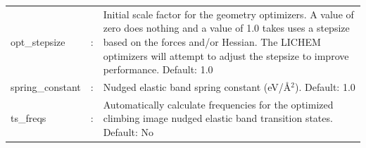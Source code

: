 \documentclass[12pt]{report}
\begin{document}
\begin{center}
\begin{longtable}{ p{4cm} c p{12.5cm}}
\\


opt\_stepsize & : & Initial scale factor for the geometry optimizers.
A value of zero does nothing and a value of 1.0 takes uses a stepsize based
on the forces and/or Hessian. The LICHEM optimizers will attempt to adjust
the stepsize to improve performance.
Default: 1.0 \newline\\

spring\_constant & : & Nudged elastic band spring constant (eV/\AA$^2$).
Default: 1.0 \newline\\

ts\_freqs & : & Automatically calculate frequencies for the optimized climbing
image nudged elastic band transition states.
Default: No
\end{longtable}
\end{center}
\vspace{-48pt}
\end{document}
